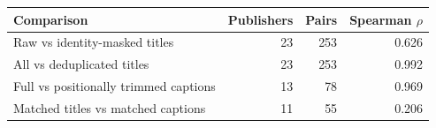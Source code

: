 \begin{tabular}{@{}lrrr@{}}
\toprule
Comparison & Publishers & Pairs & Spearman $\rho$ \\
\midrule
Raw vs identity-masked titles & 23 & 253 & 0.626 \\
All vs deduplicated titles & 23 & 253 & 0.992 \\
Full vs positionally trimmed captions & 13 & 78 & 0.969 \\
Matched titles vs matched captions & 11 & 55 & 0.206 \\
\bottomrule
\end{tabular}
